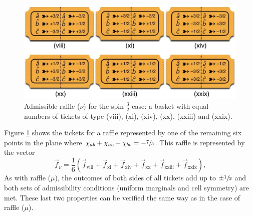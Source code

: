 
\begin{figure}[h]
 \centering
   \includegraphics[width=5.5in]{raffles-spin32-tickets-nu.jpeg} 
   \caption{Admissible raffle ($\nu$) for the spin-$\frac32$ case: a basket with equal numbers of tickets of type (viii), (xi), (xiv), (xx), (xxiii) and (xxix).}
    \label{raffles-spin32-tickets-nu}
\end{figure}

Figure \ref{raffles-spin32-tickets-nu} shows the tickets for a raffle represented by one of the remaining six points in the plane where $\chi_{ab} + \chi_{ac} + \chi_{bc} = -\sfrac75$. This raffle is represented by the vector 
\begin{equation}
\vec{f}_\nu =  \frac16 \left( \vec{f}_{\mathrm{viii}} + \vec{f}_{\mathrm{xi}} + \vec{f}_{\mathrm{xiv}} + \vec{f}_{\mathrm{xx}} + \vec{f}_{\mathrm{xxiii}} + \vec{f}_{\mathrm{xxix}} \right),
\label{vec spin 32 raffle nu}
\end{equation}
As with raffle ($\mu$), the outcomes of both sides of all tickets add up to $\pm \sfrac12$ and both sets of admissibility conditions (uniform marginals and cell symmetry) are met. These last two properties can be verified the same way as in the case of raffle ($\mu$). 

